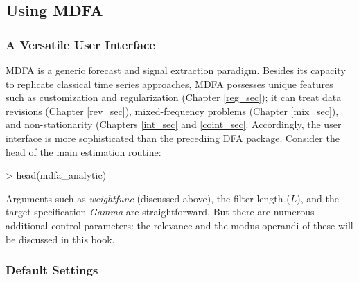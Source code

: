\documentclass[a4paper]{book}
\begin{document}
\subsection{Using MDFA}\label{control_dfa}

\subsubsection{A Versatile User Interface}

MDFA is a generic forecast and signal extraction paradigm. Besides its capacity to  replicate classical time series approaches, 
  MDFA possesses unique features such as customization and regularization (Chapter \ref{reg_sec}); it can
  treat data revisions (Chapter \ref{rev_sec}), mixed-frequency problems (Chapter \ref{mix_sec}),
 and non-stationarity (Chapters \ref{int_sec} and \ref{coint_sec}. Accordingly, the user interface 
is more sophisticated than the precediing DFA package.
Consider the head of the main estimation routine:    

\begin{Schunk}
\begin{Sinput}
> head(mdfa_analytic)
\end{Sinput}
\begin{Soutput}
1 function (L, lambda, weight_func, Lag, Gamma, eta, cutoff, i1,             
2     i2, weight_constraint, lambda_cross, lambda_decay, lambda_smooth,      
3     lin_eta, shift_constraint, grand_mean, b0_H0, c_eta, weight_structure, 
4     white_noise, synchronicity, lag_mat, troikaner)                        
5 {                                                                          
6     lambda <- abs(lambda)                                                  
\end{Soutput}
\end{Schunk}
 Arguments such as  \emph{weight\textunderscore func} (discussed above), the filter length ($L$), and the target specification \emph{Gamma}
 are straightforward.    But there are numerous additional control parameters: the relevance and the modus operandi of these
 will be discussed in this book. 


\subsubsection{Default Settings}
\end{document}
